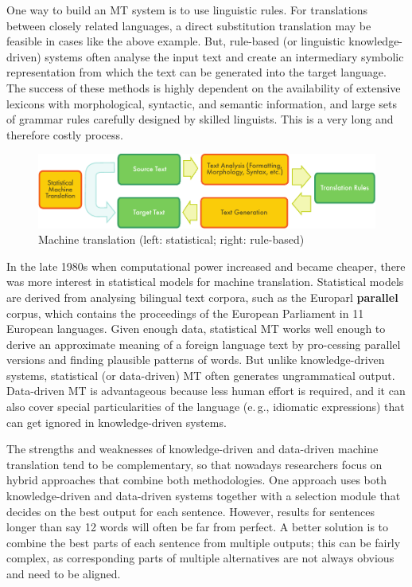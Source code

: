 \begin{multicols}{2}
One way to build an MT system is to use linguistic rules. For translations between closely related languages, a direct substitution translation may be feasible in cases like the above example. But, rule-based (or linguistic knowledge-driven) systems often analyse the input text and create an intermediary symbolic representation from which the text can be generated into the target language. The success of these methods is highly dependent on the availability of extensive lexicons with morphological, syntactic, and semantic information, and large sets of grammar rules carefully designed by skilled linguists. This is a very long and therefore costly process.

\begin{figure}[htb]
  \center
  \includegraphics[width=\textwidth]{../_media/english/machine_translation}
  \caption{Machine translation (left: statistical; right: rule-based)}
\label{fig:mtarch_en}
\end{figure}
 
In the late 1980s when computational power increased and became cheaper, there was more interest in statistical models for machine translation. Statistical models are derived from analysing bilingual text corpora, such as the Europarl \textbf{parallel} corpus, which contains the proceedings of the European Parliament in 11 European languages. Given enough data, statistical MT works well enough to derive an approximate meaning of a foreign language text by pro-cessing parallel versions and finding plausible patterns of words. But unlike knowledge-driven systems, statistical (or data-driven) MT often generates ungrammatical output. Data-driven MT is advantageous because less human effort is required, and it can also cover special particularities of the language (e.\,g., idiomatic expressions) that can get ignored in knowledge-driven systems.

The strengths and weaknesses of knowledge-driven and data-driven machine translation tend to be complementary, so that nowadays researchers focus on hybrid approaches that combine both methodologies. One approach uses both knowledge-driven and data-driven systems together with a selection module that decides on the best output for each sentence. However, results for sentences longer than say 12 words will often be far from perfect. A better solution is to combine the best parts of each sentence from multiple outputs; this can be fairly complex, as corresponding parts of multiple alternatives are not always obvious and need to be aligned. 


\end{multicols}
